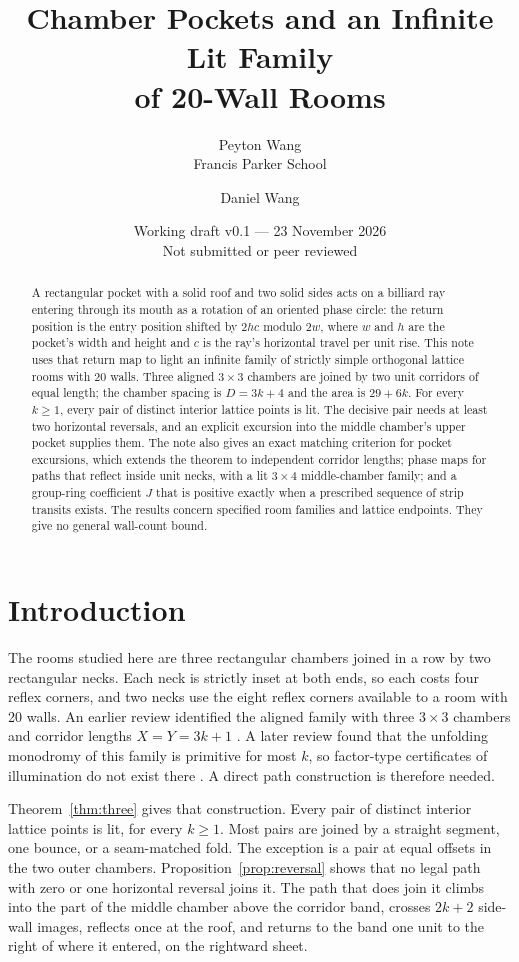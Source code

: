 \documentclass[11pt]{article}
\title{Chamber Pockets and an Infinite Lit Family\\of 20-Wall Rooms}
\author{Peyton Wang\\\small Francis Parker School \and Daniel Wang}
\date{Working draft v0.1 --- 23 November 2026\\\small Not submitted or peer reviewed}
\theoremstyle{definition}
\theoremstyle{remark}
\begin{document}
\maketitle
\begin{abstract}
A rectangular pocket with a solid roof and two solid sides acts on a billiard
ray entering through its mouth as a rotation of an oriented phase circle:
the return position is the entry position shifted by $2hc$ modulo $2w$,
where $w$ and $h$ are the pocket's width and height and $c$ is the ray's
horizontal travel per unit rise. This note uses that return map to light an
infinite family of strictly simple orthogonal lattice rooms with 20 walls.
Three aligned $3\times 3$ chambers are joined by two unit corridors of equal
length; the chamber spacing is $D=3k+4$ and the area is $29+6k$.
For every $k\ge 1$, every pair of distinct interior lattice points is lit.
The decisive pair needs at least two horizontal reversals, and an explicit
excursion into the middle chamber's upper pocket supplies them.
The note also gives an exact matching criterion for pocket excursions,
which extends the theorem to independent corridor lengths;
phase maps for paths that reflect inside unit necks, with a lit
$3\times 4$ middle-chamber family; and a group-ring coefficient $J$ that is
positive exactly when a prescribed sequence of strip transits exists.
The results concern specified room families and lattice endpoints.
They give no general wall-count bound.
\end{abstract}

\section{Introduction}
The rooms studied here are three rectangular chambers joined in a row by two
rectangular necks. Each neck is strictly inset at both ends, so each costs four
reflex corners, and two necks use the eight reflex corners available to a room
with 20 walls. An earlier review identified the aligned family with
three $3\times 3$ chambers and corridor lengths $X=Y=3k+1$
\cite{d152}. A later review found that the unfolding monodromy of this family is
primitive for most $k$, so factor-type certificates of illumination do not exist
there \cite{d199}. A direct path construction is therefore needed.

Theorem~\ref{thm:three} gives that construction. Every pair of distinct interior
lattice points is lit, for every $k\ge 1$. Most pairs are joined by a straight
segment, one bounce, or a seam-matched fold. The exception is a pair at equal
offsets in the two outer chambers. Proposition~\ref{prop:reversal} shows that
no legal path with zero or one horizontal reversal joins it. The path that does
join it climbs into the part of the middle chamber above the corridor band,
crosses $2k+2$ side-wall images, reflects once at the roof, and returns to the
band one unit to the right of where it entered, on the rightward sheet.
\end{document}
